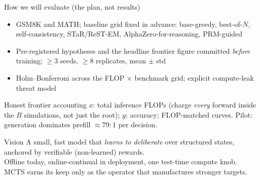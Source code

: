 \documentclass[aspectratio=169]{beamer}
\begin{document}
\begin{frame}{How we will evaluate (the plan, not results)}
  \begin{itemize}
    \item GSM8K and MATH; baseline grid fixed in advance: base-greedy, best-of-$N$, self-consistency, STaR/ReST-EM, AlphaZero-for-reasoning, PRM-guided
    \item \alert{Pre-registered} hypotheses and the headline frontier figure committed \emph{before} training; $\geq 3$ seeds, $\geq 8$ replicates, mean $\pm$ std
    \item Holm--Bonferroni across the FLOP $\times$ benchmark grid; explicit compute-leak threat model
  \end{itemize}
  \begin{block}{Honest frontier accounting}
    $x$: total inference FLOPs (charge \emph{every} forward inside the $B$ simulations, not just the root); $y$: accuracy; FLOP-matched curves. Pilot: generation dominates prefill $\approx 79{:}1$ per decision.
  \end{block}
\end{frame}

\begin{frame}[standout]{Vision}
  A small, fast model that \emph{learns to deliberate} over structured states,\\
  anchored by verifiable (non-learned) rewards.\\[0.8em]
  Offline today, online-continual in deployment, one test-time compute knob.\\[0.8em]
  \footnotesize MCTS earns its keep only as the operator that manufactures stronger targets.
\end{frame}
\end{document}
